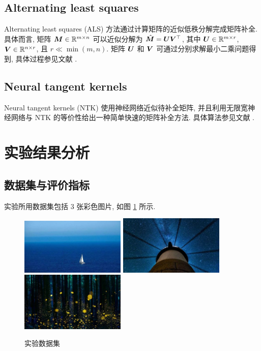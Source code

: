 \documentclass[12pt]{article}
\begin{document}
\subsection{Alternating least squares}

Alternating least squares (ALS) \cite{mnih2007probabilistic,paterek2007improving,hu2008collaborative} 方法通过计算矩阵的近似低秩分解完成矩阵补全. 具体而言, 矩阵 $\bm{M}\in\mathbb{R}^{m\times n}$ 可以近似分解为 $\hat{\bm{M}}=\bm{U}\bm{V}^\top$, 其中 $\bm{U}\in\mathbb{R}^{m\times r}$, $\bm{V}\in\mathbb{R}^{n\times r}$, 且 $r\ll \min(m,n)$. 矩阵 $\bm{U}$ 和 $\bm{V}$ 可通过分别求解最小二乘问题得到, 具体过程参见文献 \cite{hu2008collaborative}.

\subsection{Neural tangent kernels}

Neural tangent kernels (NTK) \cite{radhakrishnan2022simple} 使用神经网络近似待补全矩阵, 并且利用无限宽神经网络与 NTK 的等价性给出一种简单快速的矩阵补全方法. 具体算法参见文献 \cite{radhakrishnan2022simple}.

\section{实验结果分析}

\subsection{数据集与评价指标}

实验所用数据集包括 3 张彩色图片, 如图 \ref{fig:data} 所示.

\begin{figure}[!htbp]
  \centering
  \includegraphics[width=5cm]{1.jpeg}
  \includegraphics[width=5cm]{2.jpg}
  \includegraphics[width=5cm]{3.jpg}
  \caption{实验数据集}
  \label{fig:data}
\end{figure}
\end{document}
